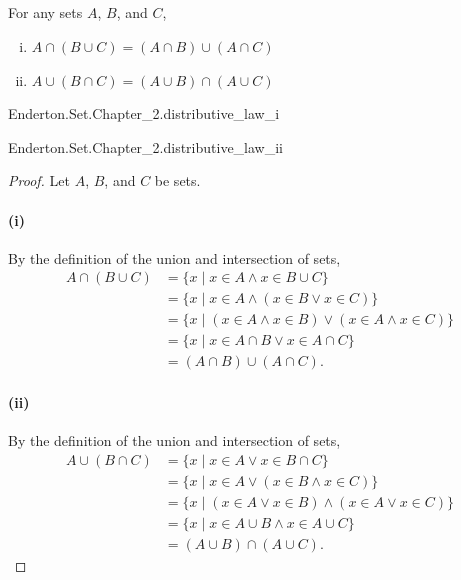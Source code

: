 \documentclass{report}
\begin{document}
\subsection{}%

  For any sets $A$, $B$, and $C$,
    \begin{enumerate}[(i)]
      \item $A \cap (B \cup C) = (A \cap B) \cup (A \cap C)$
      \item $A \cup (B \cap C) = (A \cup B) \cap (A \cup C)$
    \end{enumerate}

    {Enderton.Set.Chapter\_2.distributive\_law\_i}


    {Enderton.Set.Chapter\_2.distributive\_law\_ii}


  \begin{proof}

    Let $A$, $B$, and $C$ be sets.

    \paragraph{(i)}%

      By the definition of the union and intersection of sets,
        \begin{align*}
          A \cap (B \cup C)
            & = \{ x \mid x \in A \land x \in B \cup C \} \\
            & = \{ x \mid x \in A \land (x \in B \lor x \in C) \} \\
            & = \{ x \mid (x \in A \land x \in B) \lor
                          (x \in A \land x \in C) \} \\
            & = \{ x \mid x \in A \cap B \lor x \in A \cap C \} \\
            & = (A \cap B) \cup (A \cap C).
        \end{align*}

    \paragraph{(ii)}%

      By the definition of the union and intersection of sets,
        \begin{align*}
          A \cup (B \cap C)
            & = \{ x \mid x \in A \lor x \in B \cap C \} \\
            & = \{ x \mid x \in A \lor (x \in B \land x \in C) \} \\
            & = \{ x \mid (x \in A \lor x \in B) \land
                          (x \in A \lor x \in C) \} \\
            & = \{ x \mid x \in A \cup B \land x \in A \cup C \} \\
            & = (A \cup B) \cap (A \cup C).
        \end{align*}

  \end{proof}
\end{document}
